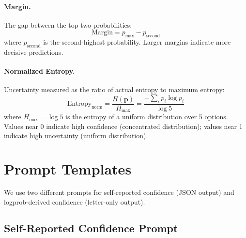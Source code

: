 \documentclass{article}
\begin{document}
\paragraph{Margin.} The gap between the top two probabilities:
\begin{equation}
\text{Margin} = p_{\max} - p_{\text{second}}
\end{equation}
where $p_{\text{second}}$ is the second-highest probability. Larger margins indicate more decisive predictions.

\paragraph{Normalized Entropy.} Uncertainty measured as the ratio of actual entropy to maximum entropy:
\begin{equation}
\text{Entropy}_{\text{norm}} = \frac{H(\mathbf{p})}{H_{\max}} = \frac{-\sum_{i} p_i \log p_i}{\log 5}
\end{equation}
where $H_{\max} = \log 5$ is the entropy of a uniform distribution over 5 options. Values near 0 indicate high confidence (concentrated distribution); values near 1 indicate high uncertainty (uniform distribution).

\section{Prompt Templates}
\label{app:prompt}

We use two different prompts for self-reported confidence (JSON output) and logprob-derived confidence (letter-only output).

\subsection{Self-Reported Confidence Prompt}
\end{document}
